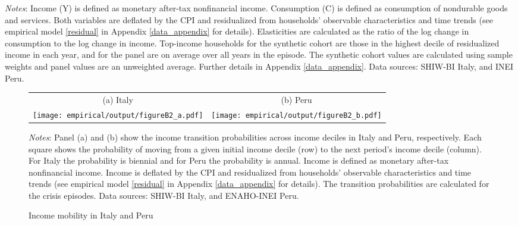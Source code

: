 \documentclass[12pt]{article}
\begin{document}
\begin{spacing}{1.5}
\begin{table}[H]
\raggedright{}\textit{\footnotesize{}Notes}{\footnotesize{}: Income (Y) is defined as monetary after-tax nonfinancial income. Consumption (C) is defined as consumption of nondurable goods and services. Both variables are deflated by the CPI and residualized from households' observable characteristics and time trends (see empirical model \eqref{residual} in Appendix \ref{data_appendix} for details). Elasticities are calculated as the ratio of the log change in consumption to the log change in income.  Top-income households for the synthetic cohort are those in the highest decile of residualized income in each year, and for the panel are on average over all years in the episode. The synthetic cohort values are calculated using sample weights and panel values are an unweighted average. Further details in Appendix \ref{data_appendix}. Data sources:  SHIW-BI Italy, and INEI Peru.}{\footnotesize\par}

\end{table}


\begin{figure}[H]
\caption{Income mobility in Italy and Peru}\label{fig_income_mob}
	\begin{tabular}{cc}
		(a) Italy & (b) Peru\\
		\texttt{[image: empirical/output/figureB2\_a.pdf]}   &
		\texttt{[image: empirical/output/figureB2\_b.pdf]} \\
	\end{tabular}
\raggedright{}\textit{\footnotesize{}Notes}{\footnotesize{}: {\color{black} Panel (a) and (b) show the income transition probabilities across income deciles in Italy and Peru, respectively. Each square shows the probability of moving from a given initial income decile (row) to the next period's income decile (column). For Italy the probability is biennial and for Peru the probability is annual. Income is defined as monetary after-tax nonfinancial income. Income is deflated by the CPI and residualized from households' observable characteristics and time trends (see empirical model  \eqref{residual} in Appendix \ref{data_appendix} for details).  The transition probabilities are calculated for the crisis episodes.  Data sources: SHIW-BI Italy,  and ENAHO-INEI Peru.}
}{\footnotesize\par}
\end{figure}



\end{spacing}
\end{document}
